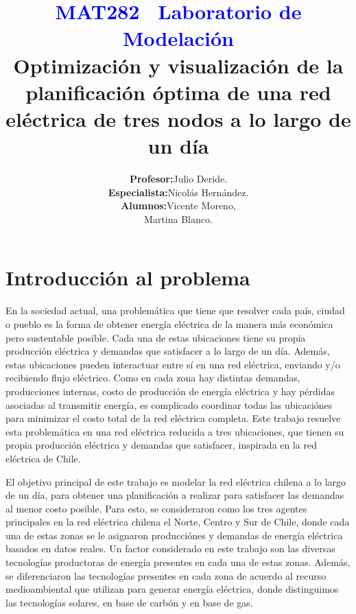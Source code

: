 \documentclass[12pt,twoside]{article}
\title{\textbf{\textcolor{blue}{MAT282 \textthreequartersemdash\ Laboratorio de Modelaci\'on }}\color{gray} \\ Optimizaci\'on y visualizaci\'on de la planificaci\'on \'optima de una red el\'ectrica de tres nodos a lo largo de un d\'ia}
\author{\begin{tabular}{rl}
		\textbf{Profesor:} & Julio Deride.\\
		\textbf{Especialista:} & Nicol\'as Hern\'andez. \\
		\textbf{Alumnos:} & Vicente Moreno, \\
		& Martina Blanco.
\end{tabular}}
\date{}
\begin{document}
	
	\maketitle
	\color{black}
	
	\newpage
	
	\renewcommand\contentsname{Indice}
	\tableofcontents

	
	\newpage
	
	\section{Introducci\'on al problema}
	
	\hspace{1cm} En la sociedad actual, una problem\'atica que tiene que resolver cada pa\'is, ciudad o pueblo es la forma de obtener energía el\'ectrica de la manera más económica pero sustentable posible. Cada una de estas ubicaciones tiene su propia producci\'on el\'ectrica y demandas que satisfacer a lo largo de un d\'ia. Adem\'as, estas ubicaciones pueden interactuar entre s\'i en una red el\'ectrica, enviando y/o recibiendo flujo el\'ectrico. Como en cada zona hay distintas demandas, producciones internas, costo de producci\'on de energ\'ia el\'ectrica y hay p\'erdidas asociadas al transmitir energ\'ia, es complicado coordinar todas las ubicaci\'ones para minimizar el costo total de la red el\'ectrica completa. Este trabajo resuelve esta problem\'atica en una red el\'ectrica reducida a tres ubicaciones, que tienen su propia producci\'on el\'ectrica y demandas que satisfacer, inspirada en la red el\'ectrica de Chile.
	
	El objetivo principal de este trabajo es modelar la red el\'ectrica chilena a lo largo de un d\'ia, para obtener una planificaci\'on a realizar para satisfacer las demandas al menor costo posible. Para esto, se consideraron como los tres agentes principales en la red el\'ectrica chilena el Norte, Centro y Sur de Chile, donde cada una de estas zonas se le asignaron producci\'ones y demandas de energ\'ia el\'ectrica basados en datos reales. Un factor considerado en este trabajo son las diversas tecnolog\'ias productoras de energía presentes en cada una de estas zonas. Adem\'as, se diferenciaron las tecnolog\'ias presentes en cada zona de acuerdo al recurso medioambiental que utilizan para generar energ\'ia el\'ectrica, donde distinguimos las tecnolog\'ias solares, en base de carb\'on y en base de gas.
	
\end{document}
